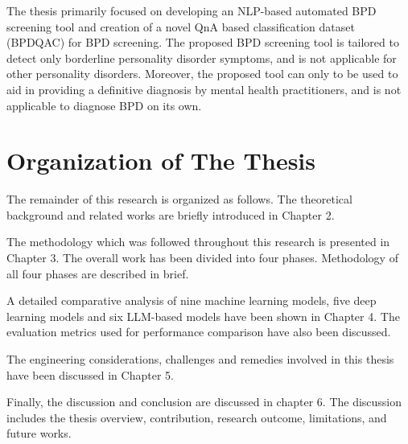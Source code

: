 The thesis primarily focused on developing an NLP-based automated BPD screening tool and creation of a novel QnA based classification dataset (BPDQAC) for BPD screening. The proposed BPD screening tool is tailored to detect only borderline personality disorder symptoms, and is not applicable for other personality disorders. Moreover, the proposed tool can only to be used to aid in providing a
definitive diagnosis by mental health practitioners, and is not applicable to diagnose BPD on its own.  \
 

\section{Organization of The Thesis}

The remainder of this research is organized as follows. 
The theoretical background and related works are briefly introduced in Chapter 2. 

The methodology which was followed throughout this research is presented in Chapter 3. The overall work has been divided into four phases. Methodology of all four phases are described in brief.

 A detailed comparative analysis of nine machine learning models, five deep learning models and six LLM-based models have been shown in Chapter 4. The evaluation metrics used for performance comparison have also been discussed.
 
 The engineering considerations, challenges and remedies involved in this thesis have been discussed in Chapter 5.

 Finally, the discussion and conclusion are discussed in chapter 6. The discussion includes the thesis overview, contribution, research outcome, limitations, and future works.

